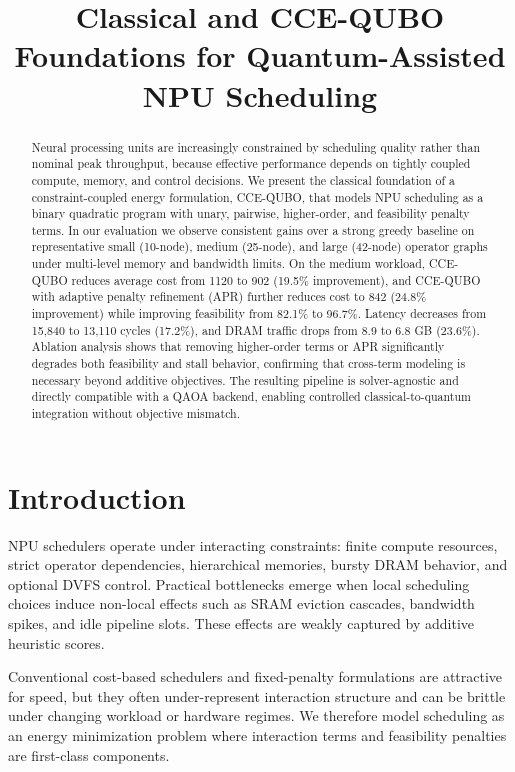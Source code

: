 \documentclass{article}
\title{Classical and CCE-QUBO Foundations for Quantum-Assisted NPU Scheduling}
\author{}
\date{}
\begin{document}
\maketitle

\begin{abstract}
Neural processing units are increasingly constrained by scheduling quality rather than nominal peak throughput, because effective performance depends on tightly coupled compute, memory, and control decisions. We present the classical foundation of a constraint-coupled energy formulation, CCE-QUBO, that models NPU scheduling as a binary quadratic program with unary, pairwise, higher-order, and feasibility penalty terms. In our evaluation we observe consistent gains over a strong greedy baseline on representative small (10-node), medium (25-node), and large (42-node) operator graphs under multi-level memory and bandwidth limits. On the medium workload, CCE-QUBO reduces average cost from 1120 to 902 (19.5\% improvement), and CCE-QUBO with adaptive penalty refinement (APR) further reduces cost to 842 (24.8\% improvement) while improving feasibility from 82.1\% to 96.7\%. Latency decreases from 15,840 to 13,110 cycles (17.2\%), and DRAM traffic drops from 8.9 to 6.8 GB (23.6\%). Ablation analysis shows that removing higher-order terms or APR significantly degrades both feasibility and stall behavior, confirming that cross-term modeling is necessary beyond additive objectives. The resulting pipeline is solver-agnostic and directly compatible with a QAOA backend, enabling controlled classical-to-quantum integration without objective mismatch.
\end{abstract}

\section{Introduction}
NPU schedulers operate under interacting constraints: finite compute resources, strict operator dependencies, hierarchical memories, bursty DRAM behavior, and optional DVFS control. Practical bottlenecks emerge when local scheduling choices induce non-local effects such as SRAM eviction cascades, bandwidth spikes, and idle pipeline slots. These effects are weakly captured by additive heuristic scores.

Conventional cost-based schedulers and fixed-penalty formulations are attractive for speed, but they often under-represent interaction structure and can be brittle under changing workload or hardware regimes. We therefore model scheduling as an energy minimization problem where interaction terms and feasibility penalties are first-class components.
\end{document}
